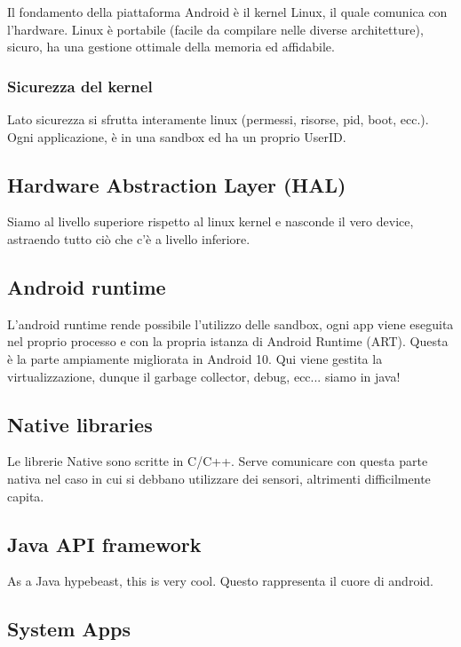 Il fondamento della piattaforma Android è il kernel Linux, il quale comunica con l'hardware. Linux è portabile (facile da compilare nelle diverse architetture), sicuro, ha una gestione ottimale della memoria ed affidabile.

\subsubsection{Sicurezza del kernel}

Lato sicurezza si sfrutta interamente linux (permessi, risorse, pid, boot, ecc.). Ogni applicazione, è in una sandbox ed ha un proprio UserID.

\subsection{Hardware Abstraction Layer (HAL)}

Siamo al livello superiore rispetto al linux kernel e nasconde il vero device, astraendo tutto ciò che c'è a livello inferiore.

\subsection{Android runtime}

L'android runtime rende possibile l'utilizzo delle sandbox, ogni app viene eseguita nel proprio processo e con la propria istanza di Android Runtime (ART). Questa è la parte ampiamente migliorata in Android 10. Qui viene gestita la virtualizzazione, dunque il garbage collector, debug, ecc... siamo in java! 

\subsection{Native libraries}

Le librerie Native sono scritte in C/C++. Serve comunicare con questa parte nativa nel caso in cui si debbano utilizzare dei sensori, altrimenti difficilmente capita.

\subsection{Java API framework}
As a Java hypebeast, this is very cool. Questo rappresenta il cuore di android.

\subsection{System Apps}

